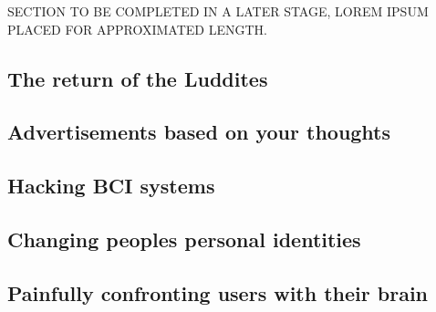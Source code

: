 
SECTION TO BE COMPLETED IN A LATER STAGE, LOREM IPSUM PLACED FOR APPROXIMATED LENGTH.

\lipsum[1-2]


\subsection{The return of the Luddites}
\label{subsec:bci_ethical_luddites}

\lipsum[1-3]


\subsection{Advertisements based on your thoughts}
\label{subsec:bci_ethical_data_mining}

\lipsum[1-2]


\subsection{Hacking BCI systems}
\label{subsec:bci_ethical_hacking}

\lipsum[1-2]


\subsection{Changing peoples personal identities}
\label{subsec:bci_ethical_identity}

\lipsum[1-3]


\subsection{Painfully confronting users with their brain}
\label{subsec:bci_ethical_confronting}

